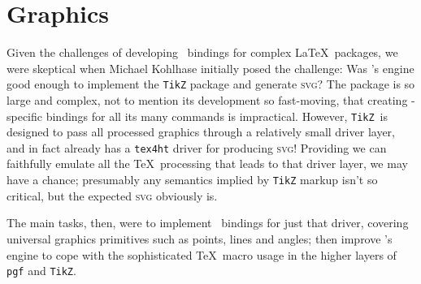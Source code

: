 \documentclass{llncs}
\def\svg{\textsc{svg}\xspace}
\def\tikz{\texttt{TikZ}\xspace}
\begin{document}


\section{Graphics}\label{graphics}
Given the challenges of developing \LaTeXML\ bindings for complex
\LaTeX\ packages, we were skeptical when Michael Kohlhase
initially posed the challenge: Was \LaTeXML's engine good
enough to implement the \tikz package and generate \svg?
The package is so large and complex, not to mention
its development so fast-moving, that creating \LaTeXML-specific
bindings for all its many commands is impractical.  However,
\tikz\ is designed to pass all processed graphics through
a relatively small driver layer, and in fact already has
a \texttt{tex4ht} driver for producing \svg!
Providing we can faithfully emulate all the \TeX\ processing
that leads to that driver layer, we may have a chance;
presumably any semantics implied by \tikz markup isn't so critical,
but the expected \svg obviously is.

The main tasks, then, were to implement \LaTeXML\ bindings
for just that driver, covering universal graphics primitives such as points, lines and angles;
then improve \LaTeXML's engine to cope
with the sophisticated \TeX\ macro usage in the higher
layers of \texttt{pgf} and \tikz.
\end{document}

